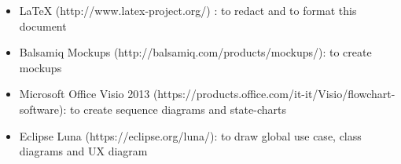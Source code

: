 \begin{itemize}
	\item LaTeX (http://www.latex-project.org/) : to redact and to format this document
	\item Balsamiq Mockups (http://balsamiq.com/products/mockups/): to create mockups
	\item Microsoft Office Visio 2013 (https://products.office.com/it-it/Visio/flowchart-software): to create sequence diagrams and state-charts
	\item Eclipse Luna (https://eclipse.org/luna/): to draw global use case, class diagrams and UX diagram
\end{itemize}